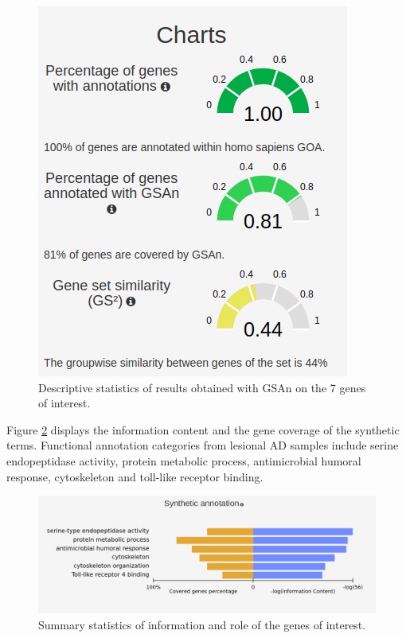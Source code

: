 \documentclass[journal, a4paper]{IEEEtran}
\begin{document}
\begin{figure}[!htp]
  \begin{center}
    \begin{minipage}{0.5 \textwidth}
      \centering
      \includegraphics[width=\textwidth]{gsan-charts.png}
      \caption{Descriptive statistics of results obtained with GSAn on the 7 genes of interest.}
      \label{fig:gsan-chart}
    \end{minipage}
  \end{center}
\end{figure}

Figure \ref{fig:synthetic-annotation} displays the information content and the gene coverage of the synthetic terms. Functional annotation categories from lesional AD samples include serine endopeptidase activity, protein metabolic process, antimicrobial humoral response, cytoskeleton and toll-like receptor binding.

\begin{figure} %
  \centering
  \includegraphics[width=\textwidth]{synthetic-annotation.png}
  \caption{Summary statistics of information and role of the genes of interest.}
  \label{fig:synthetic-annotation}
\end{figure}
\end{document}
